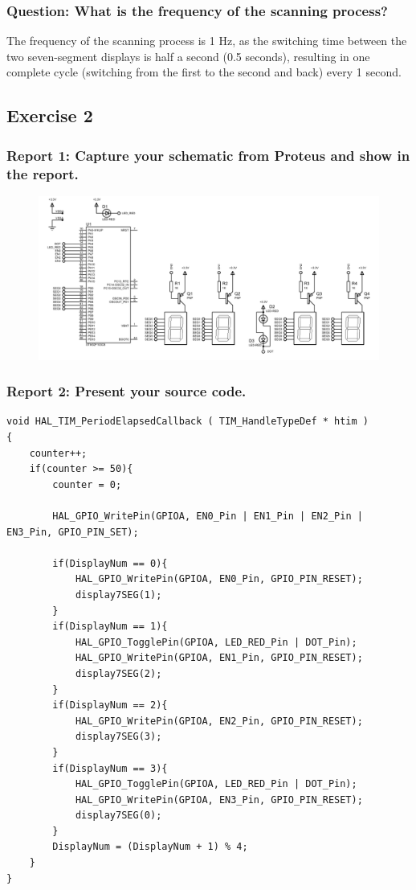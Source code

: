 \documentclass[a4paper,12pt]{article}
\begin{document}
\subsubsection{Question: What is the frequency of the scanning process?}

The frequency of the scanning process is 1 Hz, as the switching time between the two seven-segment displays is half a second (0.5 seconds), resulting in one complete cycle (switching from the first to the second and back) every 1 second.
\newpage
\subsection{Exercise 2}
\subsubsection{Report 1: Capture your schematic from Proteus and show in the report.}
\label{ex2r1}
\begin{figure}[H]
	\centering
	\includegraphics[width=0.95\linewidth]{Attachments/1.2.1.PDF}
\end{figure}
\subsubsection{Report 2: Present your source code.}
\begin{lstlisting}
void HAL_TIM_PeriodElapsedCallback ( TIM_HandleTypeDef * htim )
{
	counter++;
	if(counter >= 50){
		counter = 0;
		
		HAL_GPIO_WritePin(GPIOA, EN0_Pin | EN1_Pin | EN2_Pin | EN3_Pin, GPIO_PIN_SET);
		
		if(DisplayNum == 0){
			HAL_GPIO_WritePin(GPIOA, EN0_Pin, GPIO_PIN_RESET);
			display7SEG(1);
		}
		if(DisplayNum == 1){
			HAL_GPIO_TogglePin(GPIOA, LED_RED_Pin | DOT_Pin);
			HAL_GPIO_WritePin(GPIOA, EN1_Pin, GPIO_PIN_RESET);
			display7SEG(2);
		}
		if(DisplayNum == 2){
			HAL_GPIO_WritePin(GPIOA, EN2_Pin, GPIO_PIN_RESET);
			display7SEG(3);
		}
		if(DisplayNum == 3){
			HAL_GPIO_TogglePin(GPIOA, LED_RED_Pin | DOT_Pin);
			HAL_GPIO_WritePin(GPIOA, EN3_Pin, GPIO_PIN_RESET);
			display7SEG(0);
		}
		DisplayNum = (DisplayNum + 1) % 4;
	}
}
\end{lstlisting}
\end{document}
